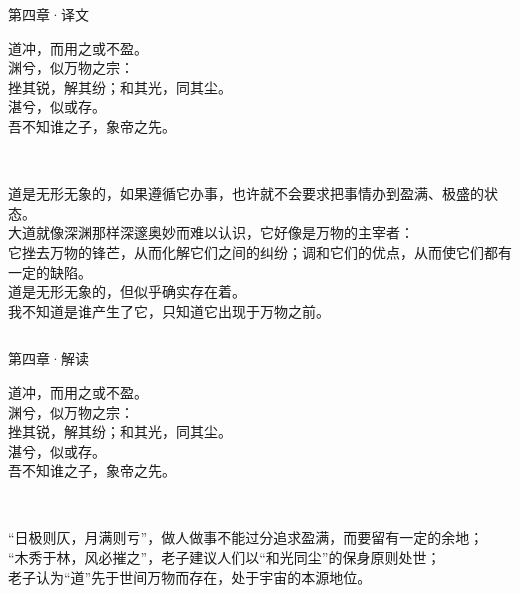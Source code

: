 \documentclass{beamer}
\newcommand{\classical}[1]{\textcolor{classical}{\kaishu #1}}         %
\newcommand{\trans}[1]{\textcolor{trans}{\fangsong #1}}              %
\newcommand{\comment}[1]{\textcolor{comment}{\kaishu #1}}            %
\newcommand{\originaltext}[1]{
	\begin{center}
		\large\classical{#1}
	\end{center}
	}
\begin{document}
\begin{frame}{第四章·译文}
	\originaltext{
	道冲，而用之或不盈。\\
	渊兮，似万物之宗：\\
	挫其锐，解其纷；和其光，同其尘。\\
	湛兮，似或存。\\
	吾不知谁之子，象帝之先。
	}
	\begin{columns}[T]
		\trans{\setlength{\parindent}{2em}\\
		道是无形无象的，如果遵循它办事，也许就不会要求把事情办到盈满、极盛的状态。\\
		大道就像深渊那样深邃奥妙而难以认识，它好像是万物的主宰者：\\
		它挫去万物的锋芒，从而化解它们之间的纠纷；调和它们的优点，从而使它们都有一定的缺陷。\\
		道是无形无象的，但似乎确实存在着。\\
		我不知道是谁产生了它，只知道它出现于万物之前。
		}
	\end{columns}
\end{frame}

\begin{frame}{第四章·解读}
	\originaltext{
	道冲，而用之或不盈。\\
	渊兮，似万物之宗：\\
	挫其锐，解其纷；和其光，同其尘。\\
	湛兮，似或存。\\
	吾不知谁之子，象帝之先。
	}
	\begin{columns}[T]
		\comment{\setlength{\parindent}{2em}\\
		“日极则仄，月满则亏”，做人做事不能过分追求盈满，而要留有一定的余地；\\
		“木秀于林，风必摧之”，老子建议人们以“和光同尘”的保身原则处世；\\
		老子认为“道”先于世间万物而存在，处于宇宙的本源地位。%
		}
	\end{columns}
\end{frame}


\end{document}

